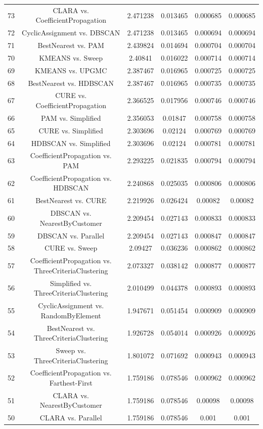 \documentclass[a4paper,10pt]{article}
\begin{document}
\begin{landscape}
\begin{table}[!htp]
\begin{tabular}{cccccc}
73&CLARA vs. CoefficientPropagation&2.471238&0.013465&0.000685&0.000685\\
72&CyclicAssignment vs. DBSCAN&2.471238&0.013465&0.000694&0.000694\\
71&BestNearest vs. PAM&2.439824&0.014694&0.000704&0.000704\\
70&KMEANS vs. Sweep&2.40841&0.016022&0.000714&0.000714\\
69&KMEANS vs. UPGMC&2.387467&0.016965&0.000725&0.000725\\
68&BestNearest vs. HDBSCAN&2.387467&0.016965&0.000735&0.000735\\
67&CURE vs. CoefficientPropagation&2.366525&0.017956&0.000746&0.000746\\
66&PAM vs. Simplified&2.356053&0.01847&0.000758&0.000758\\
65&CURE vs. Simplified&2.303696&0.02124&0.000769&0.000769\\
64&HDBSCAN vs. Simplified&2.303696&0.02124&0.000781&0.000781\\
63&CoefficientPropagation vs. PAM&2.293225&0.021835&0.000794&0.000794\\
62&CoefficientPropagation vs. HDBSCAN&2.240868&0.025035&0.000806&0.000806\\
61&BestNearest vs. CURE&2.219926&0.026424&0.00082&0.00082\\
60&DBSCAN vs. NearestByCustomer&2.209454&0.027143&0.000833&0.000833\\
59&DBSCAN vs. Parallel&2.209454&0.027143&0.000847&0.000847\\
58&CURE vs. Sweep&2.09427&0.036236&0.000862&0.000862\\
57&CoefficientPropagation vs. ThreeCriteriaClustering&2.073327&0.038142&0.000877&0.000877\\
56&Simplified vs. ThreeCriteriaClustering&2.010499&0.044378&0.000893&0.000893\\
55&CyclicAssignment vs. RandomByElement&1.947671&0.051454&0.000909&0.000909\\
54&BestNearest vs. ThreeCriteriaClustering&1.926728&0.054014&0.000926&0.000926\\
53&Sweep vs. ThreeCriteriaClustering&1.801072&0.071692&0.000943&0.000943\\
52&CoefficientPropagation vs. Farthest-First&1.759186&0.078546&0.000962&0.000962\\
51&CLARA vs. NearestByCustomer&1.759186&0.078546&0.00098&0.00098\\
50&CLARA vs. Parallel&1.759186&0.078546&0.001&0.001\\

\end{tabular}
\end{table}
\end{landscape}
\end{document}
